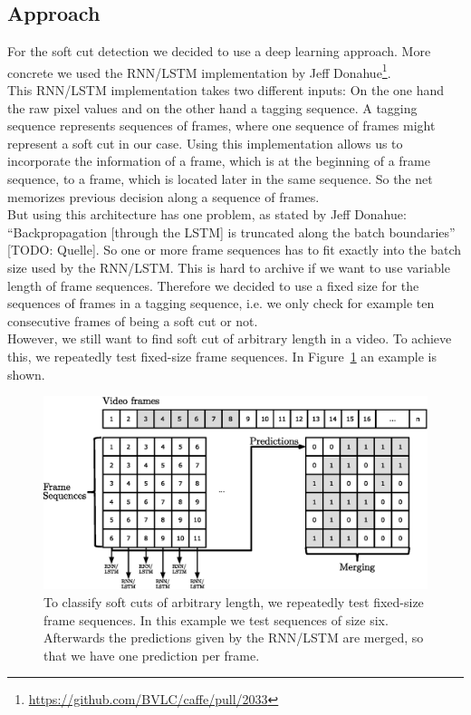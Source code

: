 \subsection{Approach}
\label{sec:soft_cut_approach}

For the soft cut detection we decided to use a deep learning approach.
More concrete we used the RNN/LSTM implementation by Jeff Donahue\footnote{\url{https://github.com/BVLC/caffe/pull/2033}}. \\
This RNN/LSTM implementation takes two different inputs: On the one hand the raw pixel values and on the other hand a tagging sequence.
A tagging sequence represents sequences of frames, where one sequence of frames might represent a soft cut in our case.
Using this implementation allows us to incorporate the information of a frame, which is at the beginning of a frame sequence, to a frame, which is located later in the same sequence.
So the net memorizes previous decision along a sequence of frames. \\
But using this architecture has one problem, as stated by Jeff Donahue: ``Backpropagation [through the LSTM] is truncated along the batch boundaries'' [TODO: Quelle].
So one or more frame sequences has to fit exactly into the batch size used by the RNN/LSTM.
This is hard to archive if we want to use variable length of frame sequences.
Therefore we decided to use a fixed size for the sequences of frames in a tagging sequence, i.e. we only check for example ten consecutive frames of being a soft cut or not.  \\
However, we still want to find soft cut of arbitrary length in a video.
To achieve this, we repeatedly test fixed-size frame sequences.
In Figure~\ref{fig:soft_cut_approach} an example is shown.
\begin{figure}[!htb]
	\centering
	\includegraphics[scale=.7]{images/soft_cut_approach.eps}
	\caption{To classify soft cuts of arbitrary length, we repeatedly test fixed-size frame sequences. In this example we test sequences of size six. Afterwards the predictions given by the RNN/LSTM are merged, so that we have one prediction per frame.}
	\label{fig:soft_cut_approach}
\end{figure}
